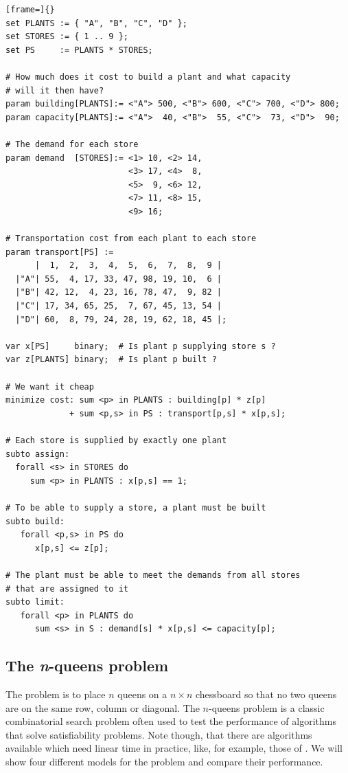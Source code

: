 \clearpage
{}
\begin{lstlisting}[frame=]{}
set PLANTS := { "A", "B", "C", "D" };
set STORES := { 1 .. 9 };
set PS     := PLANTS * STORES;

# How much does it cost to build a plant and what capacity
# will it then have?
param building[PLANTS]:= <"A"> 500, <"B"> 600, <"C"> 700, <"D"> 800;
param capacity[PLANTS]:= <"A">  40, <"B">  55, <"C">  73, <"D">  90;

# The demand for each store
param demand  [STORES]:= <1> 10, <2> 14,
                         <3> 17, <4>  8,
                         <5>  9, <6> 12,
                         <7> 11, <8> 15,
                         <9> 16;

# Transportation cost from each plant to each store
param transport[PS] :=
      |  1,  2,  3,  4,  5,  6,  7,  8,  9 |
  |"A"| 55,  4, 17, 33, 47, 98, 19, 10,  6 |
  |"B"| 42, 12,  4, 23, 16, 78, 47,  9, 82 |
  |"C"| 17, 34, 65, 25,  7, 67, 45, 13, 54 |
  |"D"| 60,  8, 79, 24, 28, 19, 62, 18, 45 |;

var x[PS]     binary;  # Is plant p supplying store s ?
var z[PLANTS] binary;  # Is plant p built ?

# We want it cheap
minimize cost: sum <p> in PLANTS : building[p] * z[p]
             + sum <p,s> in PS : transport[p,s] * x[p,s];

# Each store is supplied by exactly one plant
subto assign:
  forall <s> in STORES do
     sum <p> in PLANTS : x[p,s] == 1;

# To be able to supply a store, a plant must be built
subto build:
   forall <p,s> in PS do
      x[p,s] <= z[p];

# The plant must be able to meet the demands from all stores
# that are assigned to it
subto limit:
   forall <p> in PLANTS do
      sum <s> in S : demand[s] * x[p,s] <= capacity[p];
\end{lstlisting}
\clearpage

\subsection{The \emph{n}-queens problem}
\label{ssec:example:n-queens-problem}
The problem is to place $n$ queens on a $n\times n$ chessboard so that no
two queens are on the same row, column or diagonal.
The $n$-queens problem is a classic combinatorial search problem
often used to test the performance of algorithms that solve satisfiability
problems. Note though, that there are algorithms available which need
linear time in practice, like, for example, those of \cite{SosicGu1991}.
We will show four different models for the problem and compare
their performance.

